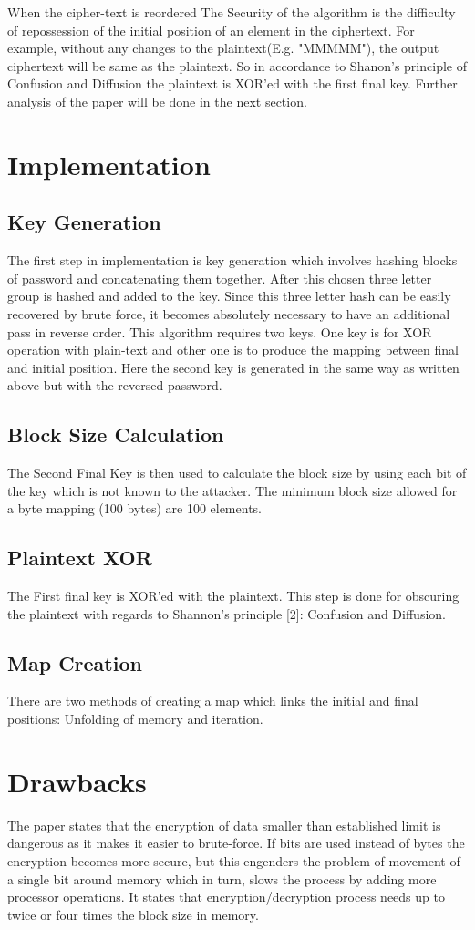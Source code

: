 \documentclass[letterpaper, 12 pt, conference]{ieeeconf}  %
\begin{document}
When the cipher-text is reordered 
The Security of the algorithm is the difficulty of repossession of the initial position of an element in the ciphertext. For example, without any changes to the plaintext(E.g. "MMMMM"), the output ciphertext will be same as the plaintext.
So in accordance to Shanon’s principle of Confusion and Diffusion the plaintext is XOR’ed with the first final key.
Further analysis of the paper will be done in the next section.


\section{Implementation}
\subsection{Key Generation}
The first step in implementation is key generation which involves hashing blocks of password and concatenating them together. After this chosen three letter group is hashed and added to the key. Since this three letter hash can be easily recovered by brute force, it becomes absolutely necessary to have an additional pass in reverse order. This algorithm requires two keys. One key is for XOR operation with plain-text and other one is to produce the mapping between final and initial position. Here the second key is generated in the same way as written above but with the reversed password.
\subsection{Block Size Calculation}
The Second Final Key is then used to calculate the block size by using each bit of the key which is not known to the attacker. The minimum block size allowed for a byte mapping (100 bytes) are 100 elements.
\subsection{Plaintext XOR}
The First final key is XOR'ed with the plaintext. This step is done for obscuring the plaintext with regards to Shannon's principle [2]: Confusion and Diffusion.
\subsection{Map Creation}
There are two methods of creating a map which links the initial and final positions: Unfolding of memory and iteration.


\section{Drawbacks}
The paper states that the encryption of data smaller than established limit is dangerous as it makes it easier to brute-force. If bits are used instead of bytes the encryption becomes more secure, but this engenders the problem of movement of a single bit around memory which in turn, slows the process by adding more processor operations. It states that encryption/decryption process needs up to twice or four times the block size in memory. 
\end{document}
